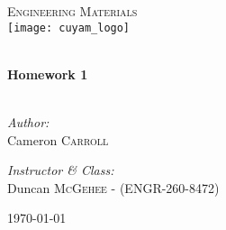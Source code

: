 \begin{titlepage}
\begin{center}

\textsc{\Large Engineering Materials}\\[0.5cm]
\texttt{[image: cuyam\_logo]}

\HRule \\[0.4cm]
{ \LARGE \bfseries Homework 1}\\[0.5cm]

\HRule \\[1.5cm]

\begin{minipage}{0.4\textwidth}
\begin{flushleft} \large
\emph{Author:}\\
Cameron \textsc{Carroll}
\end{flushleft}
\end{minipage}
\begin{minipage}{0.4\textwidth}
\begin{flushright} \large
\emph{Instructor \& Class:}\\
Duncan \textsc{McGehee} - (ENGR-260-8472)
\end{flushright}
\end{minipage}

\vfill

{\large \today}

\end{center}
\end{titlepage}